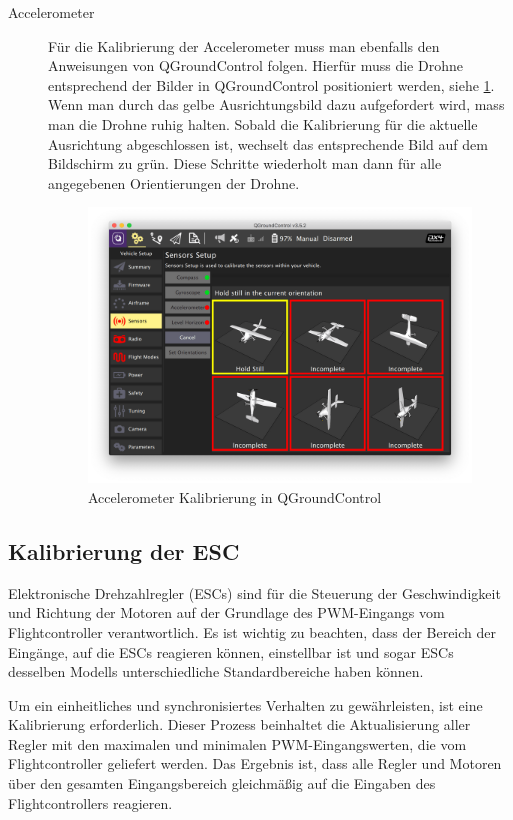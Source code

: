 \begin{description}
    \item[Accelerometer] Für die Kalibrierung der Accelerometer muss man ebenfalls den Anweisungen von QGroundControl folgen. Hierfür muss die Drohne entsprechend der Bilder in QGroundControl positioniert werden, siehe \ref{fig:accel-calibration}. Wenn man durch das gelbe Ausrichtungsbild dazu aufgefordert wird, mass man die Drohne ruhig halten. Sobald die Kalibrierung für die aktuelle Ausrichtung abgeschlossen ist, wechselt das entsprechende Bild auf dem Bildschirm zu grün. Diese Schritte wiederholt man dann für alle angegebenen Orientierungen der Drohne.
    \begin{figure}[H]
        \includegraphics[width=\textwidth]{./images/qgc-cal-accelerometer.png}
        \caption{Accelerometer Kalibrierung in QGroundControl}\label{fig:accel-calibration}
    \end{figure}

\end{description}



\subsection{Kalibrierung der ESC}
Elektronische Drehzahlregler (ESCs) sind für die Steuerung der Geschwindigkeit und Richtung der Motoren auf der Grundlage des PWM-Eingangs vom Flightcontroller verantwortlich. Es ist wichtig zu beachten, dass der Bereich der Eingänge, auf die ESCs reagieren können, einstellbar ist und sogar ESCs desselben Modells unterschiedliche Standardbereiche haben können.

Um ein einheitliches und synchronisiertes Verhalten zu gewährleisten, ist eine Kalibrierung erforderlich. Dieser Prozess beinhaltet die Aktualisierung aller Regler mit den maximalen und minimalen PWM-Eingangswerten, die vom Flightcontroller geliefert werden. Das Ergebnis ist, dass alle Regler und Motoren über den gesamten Eingangsbereich gleichmäßig auf die Eingaben des Flightcontrollers reagieren.


